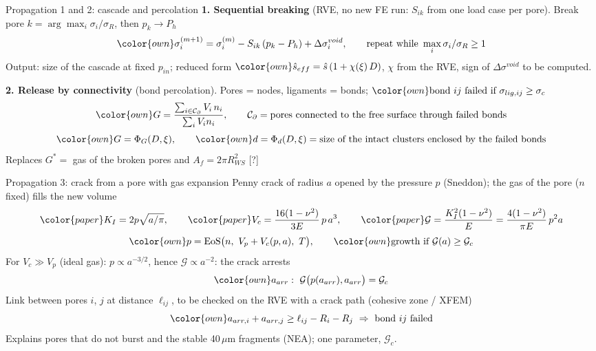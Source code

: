 \documentclass[10pt,aspectratio=169]{beamer}
\newcommand{\pp}[1]{{\color{paper}#1}}   %
\newcommand{\oo}[1]{{\color{own}#1}}     %
\begin{document}
\begin{frame}{Propagation 1 and 2: cascade and percolation}
\small
\textbf{1. Sequential breaking} (RVE, no new FE run: $S_{ik}$ from one load case per pore). Break pore $k=\arg\max_i\sigma_i/\sigma_R$, then $p_k\to P_h$
\[
\oo{\sigma_i^{(m+1)}=\sigma_i^{(m)}-S_{ik}\,(p_k-P_h)+\Delta\sigma_i^{void}},\qquad \text{repeat while }\max_i\sigma_i/\sigma_R\ge1
\]
Output: size of the cascade at fixed $p_{in}$; reduced form $\oo{\hat s_{eff}=\hat s\,(1+\chi(\xi)\,D)}$, $\chi$ from the RVE, sign of $\Delta\sigma^{void}$ to be computed.

\vspace{4pt}
\textbf{2. Release by connectivity} (bond percolation). Pores = nodes, ligaments = bonds; $\oo{\text{bond }ij\text{ failed if }\sigma_{lig,ij}\ge\sigma_c}$
\[
\oo{G=\frac{\sum_{i\in\mathcal C_\partial}V_i\,n_i}{\sum_iV_in_i}},\qquad \mathcal C_\partial=\text{pores connected to the free surface through failed bonds}
\]
\[
\oo{G=\Phi_G(D,\xi)},\qquad \oo{d=\Phi_d(D,\xi)}=\text{size of the intact clusters enclosed by the failed bonds}
\]
Replaces $G^*=$ gas of the broken pores and $A_f=2\pi R_{WS}^2$ [?]
\end{frame}

\begin{frame}{Propagation 3: crack from a pore with gas expansion}
\small
Penny crack of radius $a$ opened by the pressure $p$ (Sneddon); the gas of the pore ($n$ fixed) fills the new volume
\[
\pp{K_I=2p\sqrt{a/\pi}},\qquad \pp{V_c=\frac{16(1-\nu^2)}{3E}\,p\,a^3},\qquad \pp{\mathcal G=\frac{K_I^2(1-\nu^2)}{E}=\frac{4(1-\nu^2)}{\pi E}\,p^2a}
\]
\[
\oo{p=\mathrm{EoS}\big(n,\ V_p+V_c(p,a),\ T\big)},\qquad \oo{\text{growth if }\mathcal G(a)\ge\mathcal G_c}
\]
For $V_c\gg V_p$ (ideal gas): $p\propto a^{-3/2}$, hence $\mathcal G\propto a^{-2}$: the crack arrests
\[
\oo{a_{arr}:\ \mathcal G\big(p(a_{arr}),a_{arr}\big)=\mathcal G_c}
\]
Link between pores $i$, $j$ at distance $\ell_{ij}$, to be checked on the RVE with a crack path (cohesive zone / XFEM)
\[
\oo{a_{arr,i}+a_{arr,j}\ge\ell_{ij}-R_i-R_j\ \Rightarrow\ \text{bond }ij\text{ failed}}
\]
Explains pores that do not burst and the stable 40\,$\mu$m fragments (NEA); one parameter, $\mathcal G_c$.
\end{frame}
\end{document}
